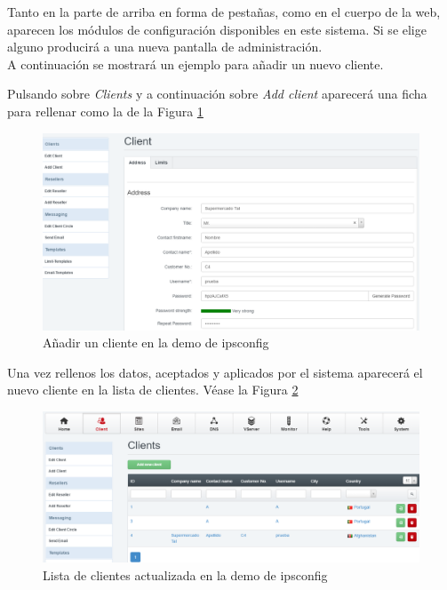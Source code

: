 Tanto en la parte de arriba en forma de pestañas,
como en el cuerpo de la web, aparecen los módulos de configuración disponibles en este sistema. Si se elige
alguno producirá a una nueva pantalla de administración.
\\

A continuación se mostrará un ejemplo para añadir un nuevo cliente.

\newpage

Pulsando sobre \textit{Clients} y a continuación sobre \textit{Add client} aparecerá una ficha para rellenar como la de la Figura \ref{fig:figura60}

\begin{figure}[H] %
	\centering
	\includegraphics[scale=0.4]{figuras/figura60.png} 
	\caption{Añadir un cliente en la demo de ipsconfig} 
	\label{fig:figura60}
\end{figure}

Una vez rellenos los datos, aceptados y aplicados por el sistema aparecerá el nuevo cliente en la lista de clientes. Véase la Figura \ref{fig:figura71}

\begin{figure}[H] %
	\centering
	\includegraphics[scale=0.4]{figuras/figura71.png} 
	\caption{Lista de clientes actualizada en la demo de ipsconfig} 
	\label{fig:figura71}
\end{figure}


